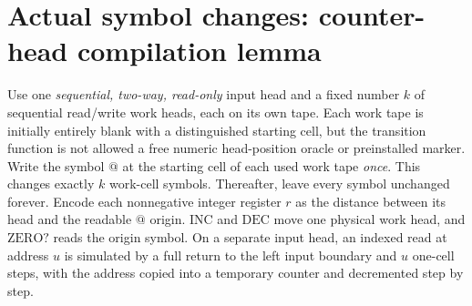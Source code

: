 \documentclass[11pt]{article}
\begin{document}
\section{Actual symbol changes: counter-head compilation lemma}
Use one \emph{sequential, two-way, read-only} input head
and a fixed number $k$ of sequential read/write work
heads, each on its own tape. Each work tape is initially
entirely blank with a distinguished starting cell,
but the transition function is not allowed a free
numeric head-position oracle or preinstalled marker.
Write the symbol $\mathtt{@}$ at the starting cell of
each used work tape \emph{once}. This changes exactly
$k$ work-cell symbols. Thereafter, leave every symbol
unchanged forever. Encode each nonnegative integer
register $r$ as the distance between its head and
the readable $\mathtt{@}$ origin. $\mathrm{INC}$ and
$\mathrm{DEC}$ move one physical work head, and
$\mathrm{ZERO?}$ reads the origin symbol. On a separate
input head, an indexed read at address $u$ is simulated
by a full return to the left input boundary and $u$
one-cell steps, with the address copied into a
temporary counter and decremented step by step.
\end{document}
